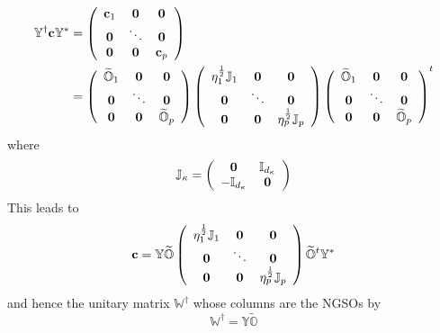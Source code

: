 \documentclass[aps,preprint]{revtex4}%
\begin{document}
\begin{align}
\mathbb{Y}^{\dagger}\mathbf{c}\mathbb{Y}^{\ast} &  =\left(
\begin{array}
[c]{ccc}%
\mathbf{c}_{1} & \mathbf{0} & \mathbf{0}\\
\mathbf{0} & \ddots & \mathbf{0}\\
\mathbf{0} & \mathbf{0} & \mathbf{c}_{p}%
\end{array}
\right)  \nonumber\\
&  =\left(
\begin{array}
[c]{ccc}%
\widetilde{\mathbb{O}}_{1} & \mathbf{0} & \mathbf{0}\\
\mathbf{0} & \ddots & \mathbf{0}\\
\mathbf{0} & \mathbf{0} & \widetilde{\mathbb{O}}_{p}%
\end{array}
\right)  \left(
\begin{array}
[c]{ccc}%
\eta_{1}^{\frac{1}{2}}\mathbb{J}_{1} & \mathbf{0} & \mathbf{0}\\
\mathbf{0} & \ddots & \mathbf{0}\\
\mathbf{0} & \mathbf{0} & \eta_{p}^{\frac{1}{2}}\mathbb{J}_{p}%
\end{array}
\right)  \left(
\begin{array}
[c]{ccc}%
\widetilde{\mathbb{O}}_{1} & \mathbf{0} & \mathbf{0}\\
\mathbf{0} & \ddots & \mathbf{0}\\
\mathbf{0} & \mathbf{0} & \widetilde{\mathbb{O}}_{p}%
\end{array}
\right)  ^{t}%
\end{align}
where
\begin{equation}
\mathbb{J}_{\kappa}=\left(
\begin{array}
[c]{cc}%
\mathbf{0} & \mathbb{I}_{d_{\kappa}}\\
-\mathbb{I}_{d_{\kappa}} & \mathbf{0}%
\end{array}
\right)
\end{equation}
This leads to
\begin{equation}
\mathbf{c}=\mathbb{Y}\widetilde{\mathbb{O}}\left(
\begin{array}
[c]{ccc}%
\eta_{1}^{\frac{1}{2}}\mathbb{J}_{1} & \mathbf{0} & \mathbf{0}\\
\mathbf{0} & \ddots & \mathbf{0}\\
\mathbf{0} & \mathbf{0} & \eta_{p}^{\frac{1}{2}}\mathbb{J}_{p}%
\end{array}
\right)  \widetilde{\mathbb{O}}^{t}\mathbb{Y}^{\ast}%
\end{equation}
and hence the unitary matrix $\mathbb{W}^{\dagger}$ whose columns are the
NGSOs by
\begin{equation}
\mathbb{W}^{\dagger}=\mathbb{Y}\widetilde{\mathbb{O}}%
\end{equation}
\end{document}
